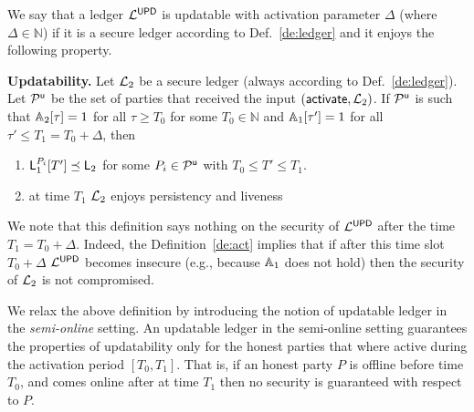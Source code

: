 \begin{definition}\label{de:act}
We say that a ledger $\mathcal{L}^\mathsf{UPD}$ is updatable with activation parameter $\Delta$ (where $\Delta\in\mathbb{N}$) if it is a secure ledger 
according to Def.~\ref{de:ledger} and it enjoys the following property.

{\bf Updatability.} Let $\mathcal{L}_2$ be a secure ledger (always according to Def.~\ref{de:ledger}).
Let $\mathcal{P}^\mathsf{u}$ be the set of parties that received the input $(\mathsf{activate}, \mathcal{L}_2)$. 
If $\mathcal{P}^\mathsf{u}$ is such that  $\mathbb{A}_2[\tau]=1$ for all $\tau\geq T_0$ for some $T_0\in\mathbb{N}$ and $\mathbb{A}_1[\tau']=1$ for all $\tau' \leq T_1=T_0 +\Delta$,  then
\begin{enumerate}
	\item $\mathsf{L}_1^{P_i}[T'] \preceq \mathsf{L}_2$ for some $P_i\in\mathcal{P}^\mathsf{u}$ with  $T_0\leq T' \leq T_1$.
	\item at time $T_1$ $\mathcal{L}_2$ enjoys persistency and liveness
\end{enumerate}
\end{definition}



We note that this definition says nothing on the security of $\mathcal{L}^\mathsf{UPD}$ after the time $T_1=T_0+\Delta$. Indeed, the Definition~\ref{de:act} implies that if
after this time slot $T_0+\Delta$ $\mathcal{L}^\mathsf{UPD}$ becomes insecure (e.g., because $\mathbb{A}_1$ does not hold) then the security of $\mathcal{L}_2$ is not compromised.

We relax the above definition by introducing the notion of updatable ledger in the \emph{semi-online} setting.
An updatable ledger in the semi-online setting guarantees the properties of updatability 
only for the honest parties that where active during the activation period $[T_0,T_1]$. That is, if an honest party $P$ is offline before time $T_0$, and comes online after at time $T_1$ then no security is guaranteed with respect to $P$.



